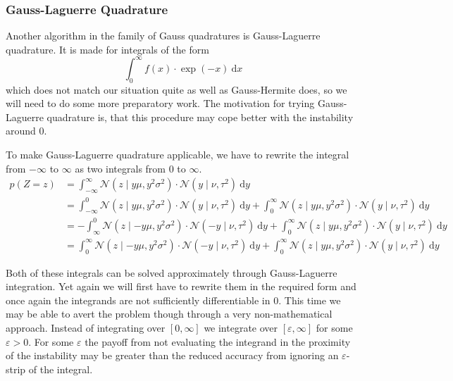 \documentclass[11pt,a4paper]{book}
\begin{document}
\subsubsection{Gauss-Laguerre Quadrature}

Another algorithm in the family of Gauss quadratures is Gauss-Laguerre
quadrature. It is made for integrals of the form
\begin{equation*}
  \int_{0}^{\infty} f(x) \cdot \exp(-x)~\mathrm{d}x
\end{equation*}
which does not match our situation quite as well as Gauss-Hermite does, so we
will need to do some more preparatory work. The motivation for trying
Gauss-Laguerre quadrature is, that this procedure may cope better with the
instability around $0$.

To make Gauss-Laguerre quadrature applicable, we have to rewrite the integral
from $-\infty$ to $\infty$ as two integrals from $0$ to $\infty$.
\begin{align*}
  p(Z = z) & = \int_{-\infty}^{\infty} \mathcal{N}\left( z \mid y\mu, y^{2}\sigma^{2} \right) \cdot \mathcal{N}(y \mid \nu, \tau^{2})~\mathrm{d}y\\
           & = \int_{-\infty}^{0} \mathcal{N}\left( z \mid y\mu, y^{2}\sigma^{2} \right) \cdot \mathcal{N}(y \mid \nu, \tau^{2})~\mathrm{d}y + \int_{0}^{\infty} \mathcal{N}\left( z \mid y\mu, y^{2}\sigma^{2} \right) \cdot \mathcal{N}(y \mid \nu, \tau^{2})~\mathrm{d}y\\
           & = -\int_{\infty}^{0} \mathcal{N}\left( z \mid -y\mu, y^{2}\sigma^{2} \right) \cdot \mathcal{N}(-y \mid \nu, \tau^{2})~\mathrm{d}y + \int_{0}^{\infty} \mathcal{N}\left( z \mid y\mu, y^{2}\sigma^{2} \right) \cdot \mathcal{N}(y \mid \nu, \tau^{2})~\mathrm{d}y\\
           & = \int_{0}^{\infty} \mathcal{N}\left( z \mid -y\mu, y^{2}\sigma^{2} \right) \cdot \mathcal{N}(-y \mid \nu, \tau^{2})~\mathrm{d}y + \int_{0}^{\infty} \mathcal{N}\left( z \mid y\mu, y^{2}\sigma^{2} \right) \cdot \mathcal{N}(y \mid \nu, \tau^{2})~\mathrm{d}y
\end{align*}

Both of these integrals can be solved approximately through Gauss-Laguerre
integration. Yet again we will first have to rewrite them in the required form
and once again the integrands are not sufficiently differentiable in $0$. This
time we may be able to avert the problem though through a very non-mathematical
approach. Instead of integrating over $[0, \infty]$ we integrate over
$[\varepsilon, \infty]$ for some $\varepsilon > 0$. For some $\varepsilon$ the
payoff from not evaluating the integrand in the proximity of the instability may
be greater than the reduced accuracy from ignoring an $\varepsilon$-strip of the
integral.
\end{document}
